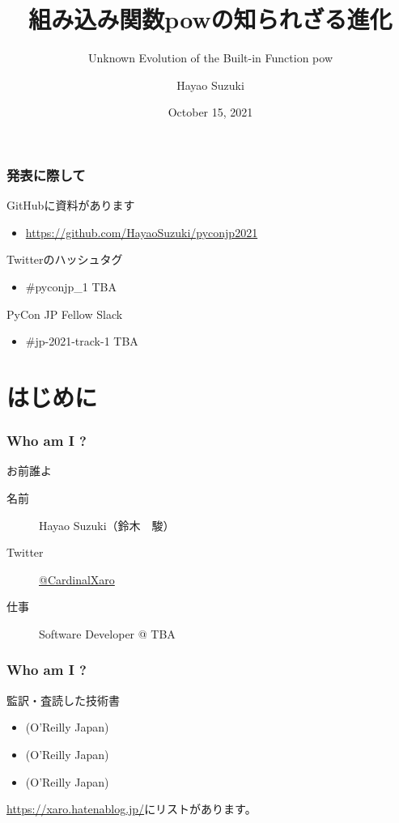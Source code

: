 \documentclass[aspectratio=169,dvipdfmx,14pt,notheorems]{beamer}
\title{組み込み関数powの知られざる進化}
\subtitle{Unknown Evolution of the Built-in Function pow}
\author[Hayao]{Hayao Suzuki}
\institute[PyCon JP 2021]{PyCon JP 2021}
\date{October 15, 2021}
\theoremstyle{definition}
\begin{document}
\begin{frame}[plain]\frametitle{}
\titlepage %
\end{frame}

\begin{frame}\frametitle{発表に際して}

\begin{block}{GitHubに資料があります}
\begin{itemize}
\item \url{https://github.com/HayaoSuzuki/pyconjp2021}
\end{itemize}
\end{block}

\begin{block}{Twitterのハッシュタグ}
\begin{itemize}
\item \#pyconjp\_1 TBA
\end{itemize}
\end{block}

\begin{block}{PyCon JP Fellow Slack}
\begin{itemize}
\item \#jp-2021-track-1 TBA
\end{itemize}
\end{block}
\end{frame}

\section{はじめに}

\begin{frame}\frametitle{Who am I ?}

\begin{block}{お前誰よ}
\begin{description}
\item[名前] Hayao Suzuki（鈴木　駿）
\item[Twitter] \href{https://twitter.com/CardinalXaro}{@CardinalXaro}
\item[仕事] Software Developer @ TBA
\end{description}
\end{block}

\end{frame}

\begin{frame}\frametitle{Who am I ?}

\begin{block}{監訳・査読した技術書}
\begin{itemize}
\item {}(O'Reilly Japan)
\item {}(O'Reilly Japan)
\item {}(O'Reilly Japan) 
\end{itemize}
\end{block}
\url{https://xaro.hatenablog.jp/}にリストがあります。
\end{frame}
\end{document}

